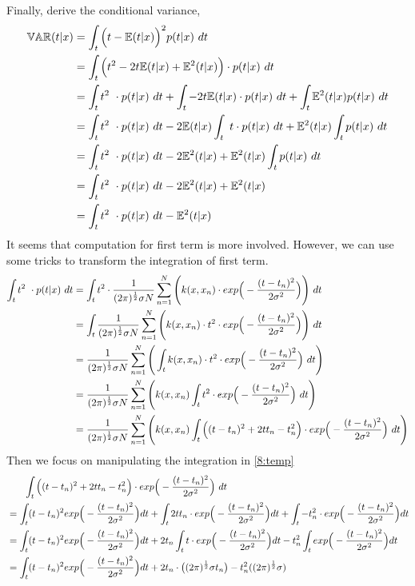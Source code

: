 \documentclass[11pt,a4paper]{article}
\newcommand{\htab}{\hspace*{0.63cm}}
\begin{document}
{\htab Finally, derive the conditional variance, 
    \begin{align}
        \mathbb{VAR}(t|x) &= \int_{t} \Big(t - \mathbb{E}(t|x)\Big)^{2} p(t|x) \ dt \\
                  &= \int_{t} \Big( t^{2} - 2t \mathbb{E}(t|x) + \mathbb{E}^{2}(t|x) \Big) \cdot p(t|x) \ dt \\
                  &= \int_{t} t^{2}\ \cdot p(t|x) \ dt + \int_{t} -2 t \mathbb{E}(t|x)  \cdot p(t|x) \ dt 
        + \int_{t} \mathbb{E}^{2}(t|x) p(t|x) \ dt  \\
                  &= \int_{t} t^{2}\ \cdot p(t|x) \ dt - 2\mathbb{E}(t|x) \int_{t} \ t \cdot p(t|x) \ dt 
        + \mathbb{E}^{2}(t|x) \int_{t} p(t|x) \ dt  \\
        &= \int_{t} t^{2}\ \cdot p(t|x) \ dt - 2\mathbb{E}^{2}(t|x)  + \mathbb{E}^{2}(t|x) \int_{t} p(t|x) \ dt  \\
        &= \int_{t} t^{2}\ \cdot p(t|x) \ dt - 2\mathbb{E}^{2}(t|x)  + \mathbb{E}^{2}(t|x)  \\
        &= \int_{t} t^{2}\ \cdot p(t|x) \ dt - \mathbb{E}^{2}(t|x)  
        \label{3:covariance}
    \end{align}
\htab It seems that computation for first term is more involved. However, we can use some tricks to transform the integration of first term. 
    \begin{align} 
        \int_{t} t^{2}\ \cdot p(t|x) \ dt 
        &= \int_{t} t^{2} \cdot \frac{1}{(2\pi)^{\frac{1}{2}} \sigma N} \sum_{n=1}^{N} \Bigg( k(x,x_{n}) \cdot exp \Big( - \frac{(t-t_{n})^{2}}{2\sigma^{2}} \Big) \Bigg) \ dt \\
        &= \int_{t} \frac{1}{(2\pi)^{\frac{1}{2}} \sigma N}  \sum_{n=1}^{N}  \Bigg( k(x,x_{n}) \cdot t^{2} \cdot exp \Big( - \frac{(t-t_{n})^{2}}{2\sigma^{2}} \Big) \Bigg) \ dt \\
        &=  \frac{1}{(2\pi)^{\frac{1}{2}} \sigma N}  \sum_{n=1}^{N}  \Bigg( \int_{t} k(x,x_{n}) \cdot t^{2} \cdot exp \Big( - \frac{(t-t_{n})^{2}}{2\sigma^{2}} \Big) \ dt \Bigg)  \\
        &=  \frac{1}{(2\pi)^{\frac{1}{2}} \sigma N}  \sum_{n=1}^{N}  \Bigg( k(x,x_{n}) \int_{t} t^{2} \cdot exp \Big( - \frac{(t-t_{n})^{2}}{2\sigma^{2}} \Big) \ dt \Bigg) \\
        &=  \frac{1}{(2\pi)^{\frac{1}{2}} \sigma N}  \sum_{n=1}^{N}  \Bigg( k(x,x_{n}) 
        \int_{t} \Big( (t-t_{n})^{2} + 2tt_{n} - t_{n}^{2} \Big) \cdot exp \Big( - \frac{(t-t_{n})^{2}}{2\sigma^{2}} \Big) \ dt \Bigg)  
        \label{8:temp}
    \end{align}
\htab Then we focus on manipulating the integration in \eqref{8:temp}
    \begin{align}
        &\htab \intt \Big( (t-t_{n})^{2} + 2tt_{n} - t_{n}^{2} \Big) \cdot \expt \ dt \\
        & = \intt (t-t_{n})^{2} \expt dt + \intt  2tt_{n} \cdot \expt dt + \intt - t_{n}^{2} \cdot \expt dt \\
        & = \intt (t-t_{n})^{2} \expt dt + 2 t_{n} \intt  t \cdot \expt dt - t_{n}^{2} \intt \expt dt \\
        & = \intt (t-t_{n})^{2} \expt dt + 2 t_{n} \cdot \big(\gcoeffinv t_{n}\big) - t_{n}^{2} ( \gcoeffinv )\\

\end{align}}
\end{document}
